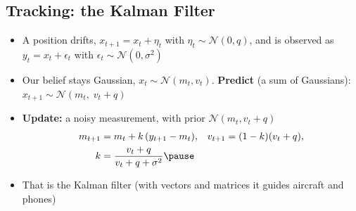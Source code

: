 \begin{slide}
\section[-1]{Tracking: the Kalman Filter}

\begin{PauseHighLight}\squeeze
  \begin{itemize}
  \item A position drifts, $x_{t+1} = x_t + \eta_t$ with
    $\eta_t\sim\mathcal{N}(0,q)$, and is observed as $y_t = x_t +
    \epsilon_t$ with $\epsilon_t\sim\mathcal{N}(0,\sigma^2)$\pause
  \item Our belief stays Gaussian, $x_t\sim\mathcal{N}(m_t, v_t)$.
    \textbf{Predict} (a sum of Gaussians):
    $x_{t+1}\sim\mathcal{N}(m_t,\; v_t + q)$\pause
  \item \textbf{Update:} a noisy measurement, with prior
    $\mathcal{N}(m_t, v_t+q)$
    \begin{align*}
      m_{t+1} &= m_t + k\,(y_{t+1} - m_t), &
      v_{t+1} &= (1-k)(v_t + q),\\
      k &= \frac{v_t+q}{v_t+q+\sigma^2}\pause
    \end{align*}
  \item That is the Kalman filter (with vectors and matrices it guides
    aircraft and phones)\pause
  \end{itemize}
\end{PauseHighLight}

\end{slide}


